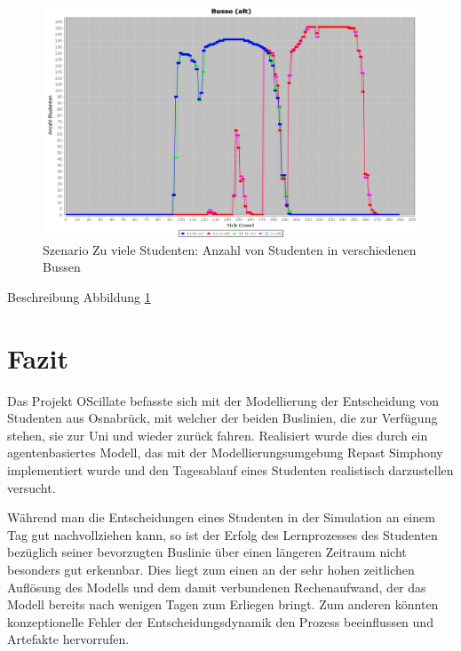 \documentclass[12pt,a4paper]{scrartcl}
\begin{document}
\begin{figure}
\includegraphics[scale=0.4]{Viele_Studenten_Busse.png}
\caption{Szenario \glqq Zu viele Studenten\grqq : Anzahl von Studenten in verschiedenen Bussen}
\label{s2g2}
\end{figure}

Beschreibung Abbildung \ref{s2g2}

\newpage

\section{Fazit}\label{fazit}
Das Projekt OScillate befasste sich mit der Modellierung der Entscheidung von Studenten aus Osnabrück, mit welcher der beiden Buslinien, die zur Verfügung stehen, sie zur Uni und wieder zurück fahren. Realisiert wurde dies durch ein agentenbasiertes Modell, das mit der Modellierungsumgebung Repast Simphony implementiert wurde und den Tagesablauf eines Studenten realistisch darzustellen versucht. 

Während man die Entscheidungen eines Studenten in der Simulation an einem Tag gut nachvollziehen kann, so ist der Erfolg des Lernprozesses des Studenten bezüglich seiner bevorzugten Buslinie über einen längeren Zeitraum nicht besonders gut erkennbar. Dies liegt zum einen an der sehr hohen zeitlichen Auflösung des Modells und dem damit verbundenen Rechenaufwand, der das Modell bereits nach wenigen Tagen zum Erliegen bringt. Zum anderen könnten konzeptionelle Fehler der Entscheidungsdynamik den Prozess beeinflussen und Artefakte hervorrufen. 
\end{document}
